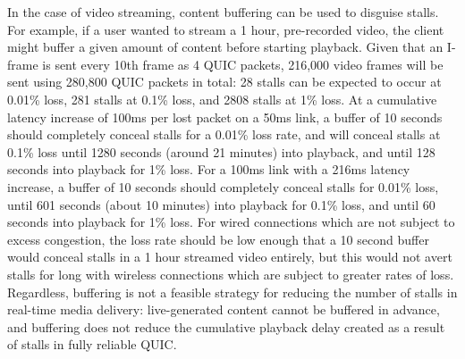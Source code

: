 \documentclass{mpaper}
\begin{document}

In the case of video streaming, content buffering can be used to disguise stalls. For example, if a user wanted to stream a 1 hour, pre-recorded video, the client might buffer a given amount of content before starting playback. Given that an I-frame is sent every 10th frame as 4 QUIC packets, 216,000 video frames will be sent using 280,800 QUIC packets in total: 28 stalls can be expected to occur at 0.01\% loss, 281 stalls at 0.1\% loss, and 2808 stalls at 1\% loss. At a cumulative latency increase of 100ms per lost packet on a 50ms link, a buffer of 10 seconds should completely conceal stalls for a 0.01\% loss rate, and will conceal stalls at 0.1\% loss until 1280 seconds (around 21 minutes) into playback, and until 128 seconds into playback for 1\% loss. For a 100ms link with a 216ms latency increase, a buffer of 10 seconds should completely conceal stalls for 0.01\% loss, until 601 seconds (about 10 minutes) into playback for 0.1\% loss, and until 60 seconds into playback for 1\% loss. For wired connections which are not subject to excess congestion, the loss rate should be low enough that a 10 second buffer would conceal stalls in a 1 hour streamed video entirely, but this would not avert stalls for long with wireless connections which are subject to greater rates of loss. Regardless, buffering is not a feasible strategy for reducing the number of stalls in real-time media delivery: live-generated content cannot be buffered in advance, and buffering does not reduce the cumulative playback delay created as a result of stalls in fully reliable QUIC.
\end{document}

